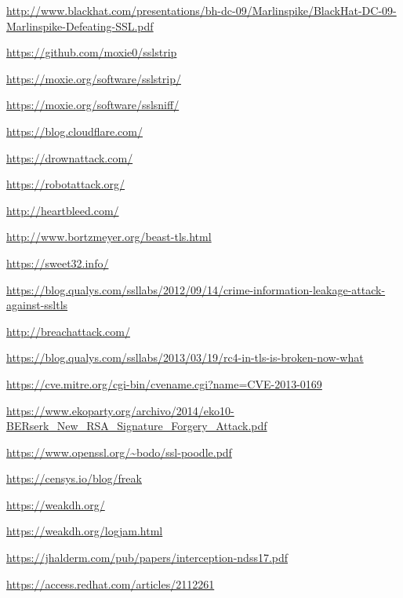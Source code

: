 \begin{thebibliography}{4}

  \url{http://www.blackhat.com/presentations/bh-dc-09/Marlinspike/BlackHat-DC-09-Marlinspike-Defeating-SSL.pdf}

  \url{https://github.com/moxie0/sslstrip}

  \url{https://moxie.org/software/sslstrip/}

  \url{https://moxie.org/software/sslsniff/}

  \url{https://blog.cloudflare.com/}

  \url{https://drownattack.com/}

  \url{https://robotattack.org/}

  \url{http://heartbleed.com/}

  \url{http://www.bortzmeyer.org/beast-tls.html}

  \url{https://sweet32.info/}

  \url{https://blog.qualys.com/ssllabs/2012/09/14/crime-information-leakage-attack-against-ssltls}

  \url{http://breachattack.com/}

  \url{https://blog.qualys.com/ssllabs/2013/03/19/rc4-in-tls-is-broken-now-what}

  \url{https://cve.mitre.org/cgi-bin/cvename.cgi?name=CVE-2013-0169}

  \url{https://www.ekoparty.org/archivo/2014/eko10-BERserk_New_RSA_Signature_Forgery_Attack.pdf}

  \url{https://www.openssl.org/~bodo/ssl-poodle.pdf}

  \url{https://censys.io/blog/freak}

  \url{https://weakdh.org/}

  \url{https://weakdh.org/logjam.html}

  \url{https://jhalderm.com/pub/papers/interception-ndss17.pdf}

  \url{https://access.redhat.com/articles/2112261}

\end{thebibliography}
